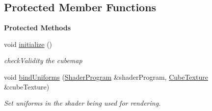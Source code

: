 \subsection*{Protected Member Functions}
\begin{Indent}\textbf{ Protected Methods}\par
\begin{DoxyCompactItemize}
\item 
\mbox{\label{classrev_1_1_cube_map_component_ace60fbcef3079dc4db83dda4f673f6ba}} 
void \mbox{\hyperlink{classrev_1_1_cube_map_component_ace60fbcef3079dc4db83dda4f673f6ba}{initialize}} ()
\begin{DoxyCompactList}\small\item\em check\+Validity the cubemap \end{DoxyCompactList}\item 
\mbox{\label{classrev_1_1_cube_map_component_af23896ca51c1a73afb7a16e2156d5ba0}} 
void \mbox{\hyperlink{classrev_1_1_cube_map_component_af23896ca51c1a73afb7a16e2156d5ba0}{bind\+Uniforms}} (\mbox{\hyperlink{classrev_1_1_shader_program}{Shader\+Program}} \&shader\+Program, \mbox{\hyperlink{classrev_1_1_cube_texture}{Cube\+Texture}} \&cube\+Texture)
\begin{DoxyCompactList}\small\item\em Set uniforms in the shader being used for rendering. \end{DoxyCompactList}\end{DoxyCompactItemize}
\end{Indent}
